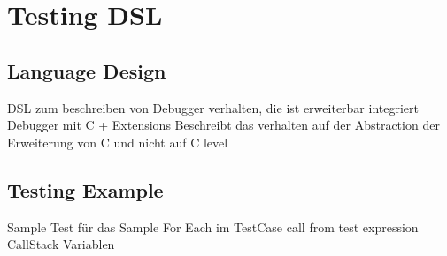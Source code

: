 \section{Testing DSL}

\subsection{Language Design}
DSL zum beschreiben von Debugger verhalten, die ist erweiterbar integriert Debugger mit C + Extensions
	Beschreibt das verhalten auf der Abstraction der Erweiterung von C und nicht auf C level 
	
\subsection{Testing Example}
Sample
	Test für das Sample
		For Each im TestCase call from test expression
			CallStack
			Variablen